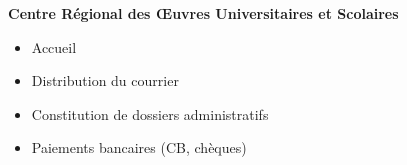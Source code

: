\documentclass[9pt,a4paper,academicons]{altacv}
\begin{document}
\divider

\textbf{Centre Régional des Œuvres Universitaires et Scolaires}
\small{
  \begin{itemize}
    \item Accueil
    \item Distribution du courrier
    \item Constitution de dossiers administratifs
    \item Paiements bancaires (CB, chèques)
  \end{itemize}
}




\medskip


\newpage
\end{document}
